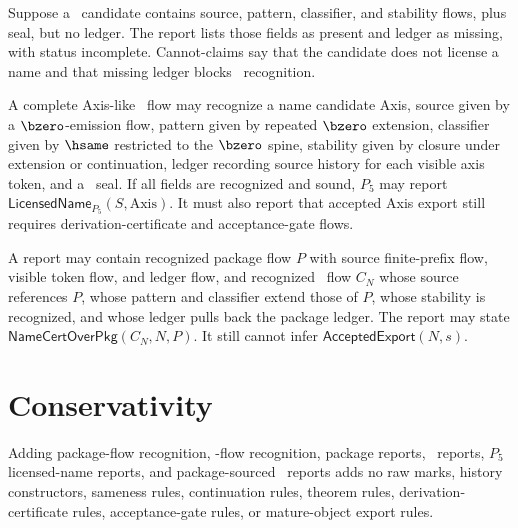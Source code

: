 \begin{example}
\label{ex:pkg-namecert-namecert-missing-ledger}
Suppose a \NameCert\ candidate contains source, pattern, classifier, and stability flows, plus seal, but no ledger. The report lists those fields as present and ledger as missing, with status incomplete. Cannot-claims say that the candidate does not license a name and that missing ledger blocks \NameCert\ recognition.
\end{example}

\begin{example}
\label{ex:pkg-namecert-axis-like-namecert}
A complete Axis-like \NameCert\ flow may recognize a name candidate Axis, source given by a $\bzero$-emission flow, pattern given by repeated $\bzero$ extension, classifier given by $\hsame$ restricted to the $\bzero$ spine, stability given by closure under extension or continuation, ledger recording source history for each visible axis token, and a \NameCert\ seal. If all fields are recognized and sound, $P_5$ may report $\mathsf{LicensedName}_{P_5}(S,\mathrm{Axis})$. It must also report that accepted Axis export still requires derivation-certificate and acceptance-gate flows.
\end{example}

\begin{example}
\label{ex:pkg-namecert-package-sourced}
A report may contain recognized package flow $P$ with source finite-prefix flow, visible token flow, and ledger flow, and recognized \NameCert\ flow $C_N$ whose source references $P$, whose pattern and classifier extend those of $P$, whose stability is recognized, and whose ledger pulls back the package ledger. The report may state $\mathsf{NameCertOverPkg}(C_N,N,P)$. It still cannot infer $\mathsf{AcceptedExport}(N,s)$.
\end{example}

\section{Conservativity}
\label{sec:pkg-namecert-conservativity}

\begin{theorem}
\label{thm:pkg-namecert-p5-conservative}
Adding package-flow recognition, \NameCert-flow recognition, package reports, \NameCert\ reports, $P_5$ licensed-name reports, and package-sourced \NameCert\ reports adds no raw marks, history constructors, sameness rules, continuation rules, theorem rules, derivation-certificate rules, acceptance-gate rules, or mature-object export rules.
\end{theorem}

